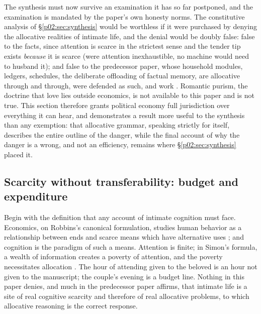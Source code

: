 \documentclass[11pt,a4paper]{article}
\begin{document}
The synthesis must now survive an examination it has so far postponed, and the examination is mandated by the paper's own honesty norms. The constitutive analysis of \S\ref{p02:sec:synthesis} would be worthless if it were purchased by denying the allocative realities of intimate life, and the denial would be doubly false: false to the facts, since attention is scarce in the strictest sense and the tender tip exists \emph{because} it is scarce (were attention inexhaustible, no machine would need to husband it); and false to the predecessor paper, whose household modules, ledgers, schedules, the deliberate offloading of factual memory, are allocative through and through, were defended as such, and work \parencite{huang2025toward}. Romantic purism, the doctrine that love lies outside economics, is not available to this paper and is not true. This section therefore grants political economy full jurisdiction over everything it can hear, and demonstrates a result more useful to the synthesis than any exemption: that allocative grammar, speaking strictly for itself, describes the entire outline of the danger, while the final account of why the danger is a wrong, and not an efficiency, remains where \S\ref{p02:sec:synthesis} placed it.

\subsection{Scarcity without transferability: budget and expenditure}
\label{p02:sec:pe-budget}

Begin with the definition that any account of intimate cognition must face. Economics, on Robbins's canonical formulation, studies human behavior as a relationship between ends and scarce means which have alternative uses \parencite{robbins1932essay}; and cognition is the paradigm of such a means. Attention is finite; in Simon's formula, a wealth of information creates a poverty of attention, and the poverty necessitates allocation \parencite{simon1971designing}. The hour of attending given to the beloved is an hour not given to the manuscript; the couple's evening is a budget line. Nothing in this paper denies, and much in the predecessor paper affirms, that intimate life is a site of real cognitive scarcity and therefore of real allocative problems, to which allocative reasoning is the correct response.
\end{document}
